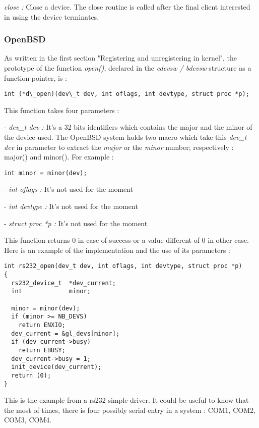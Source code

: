 \documentclass[11pt]{report}
\begin{document}
{\it close :} Close a device. The close routine is called after the final
client interested in using the device terminates.

\subsubsection{OpenBSD}

As written in the first section "Registering and unregistering in kernel", the
prototype of the function {\it open()}, declared in the {\it cdevsw / bdevsw}
structure as a function pointer, is :
\begin{lstlisting}
int (*d\_open)(dev\_t dev, int oflags, int devtype, struct proc *p);
\end{lstlisting}
This function takes four parameters :
\begin{description}
  \item{- {\it dev\_t dev :} It's a 32 bits identifiers which contains the major and the
  minor of the device used. The OpenBSD system holds two macro which take this
  {\it dev\_t dev} in parameter to extract the {\it major} or the {\it minor} number;
  respectively : major() and minor(). For example :
  \begin{lstlisting}
int minor = minor(dev);
  \end{lstlisting}
  }
  \item{- {\it int oflags :} It's not used for the moment}
  \item{- {\it int devtype :} It's not used for the moment}
  \item{- {\it struct proc *p :} It's not used for the moment}
\end{description}
This function returns 0 in case of success or a value different of 0 in other case.\\
Here is an example of the implementation and the use of its parameters :
\begin{lstlisting}
int rs232_open(dev_t dev, int oflags, int devtype, struct proc *p)
{
  rs232_device_t  *dev_current;
  int             minor;

  minor = minor(dev);
  if (minor >= NB_DEVS)
    return ENXIO;
  dev_current = &gl_devs[minor];
  if (dev_current->busy)
    return EBUSY;
  dev_current->busy = 1;
  init_device(dev_current);
  return (0);
}
\end{lstlisting}
This is the example from a rs232 simple driver. It could be useful to know that the most of times,
there is four possibly serial entry in a system : COM1, COM2, COM3, COM4.\\
\end{document}
